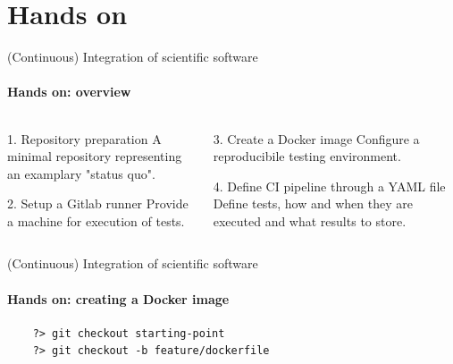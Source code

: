 \section{Hands on}

\begin{frame}{(Continuous) Integration of scientific software}
    \framesubtitle{Hands on: overview}
    \begin{columns}
    \begin{column}{0.48\textwidth}
        \begin{block}{1. Repository preparation}
            A minimal repository representing an examplary
            "status quo".
        \end{block}
        \begin{block}{2. Setup a Gitlab runner}
            Provide a machine for execution of tests.
        \end{block}
    \end{column}

    \begin{column}{0.48\textwidth}
        \begin{exampleblock}{3. Create a Docker image}
            Configure a reproducibile testing environment.
        \end{exampleblock}
        \begin{block}{4. Define CI pipeline through a YAML file}
            Define tests, how and when they are executed and what
            results to store.
        \end{block}
    \end{column}
    \end{columns}
\end{frame}

\begin{frame}{(Continuous) Integration of scientific software} 
    \framesubtitle{Hands on: creating a Docker image} 

    \vfill

    \begin{verbatim}
    ?> git checkout starting-point 
    ?> git checkout -b feature/dockerfile
    \end{verbatim}

\end{frame}

